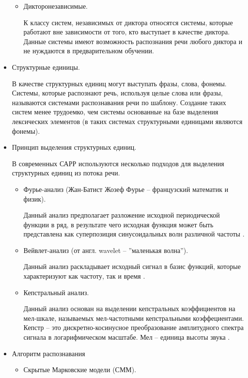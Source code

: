 \begin{itemize}
\begin{itemize}
		\item Дикторонезависимые.
		
		К классу систем, независимых от диктора относятся системы, которые 	работают вне зависимости от того, кто выступает в качестве диктора. Данные системы имеют возможность распознания речи любого диктора и не нуждаются в предварительном обучении.
		
	\end{itemize}
	\item Структурные единицы. 
	
	В качестве структурных единиц могут выступать фразы, слова, фонемы. Системы, которые распознают речь, используя целые слова или фразы, называются системами распознавания речи по шаблону. Создание таких систем менее трудоемко, чем системы основанные на базе выделения лексических элементов (в таких системах структурными единицами являются фонемы). 
	
	\item Принцип выделения структурных единиц.
	
	В современных САРР используются несколько подходов для выделения структурных единиц из потока речи. 
	\begin{itemize}
		\item Фурье-анализ (Жан-Батист Жозеф Фурье -- французский математик и физик). 
		
		Данный анализ предполагает разложение исходной периодической функции в ряд, в результате чего исходная функция может быть представлена как суперпозиция синусоидальных волн различной частоты \cite{fur_veivlet}.
		\item Вейвлет-анализ (от англ. wavelet -- ''маленькая волна''). 
		
		Данный анализ раскладывает исходный сигнал в базис функций, которые характеризуют как частоту, так и время \cite{fur_veivlet}.
		\item Кепстральный анализ. 
		
		Данный анализ основан на выделении кепстральных коэффициентов на мел-шкале, называемых мел-частотными кепстральными коэффециентами. Кепстр -- это дискретно-косинусное преобразование амплитудного спектра сигнала в логарифмическом масштабе. Мел -- единица высоты звука \cite{kepstr}.
	\end{itemize}
	
	\item Алгоритм распознавания
	\begin{itemize}
		\item Скрытые Марковские модели (СММ).
		

\end{itemize}
\end{itemize}
